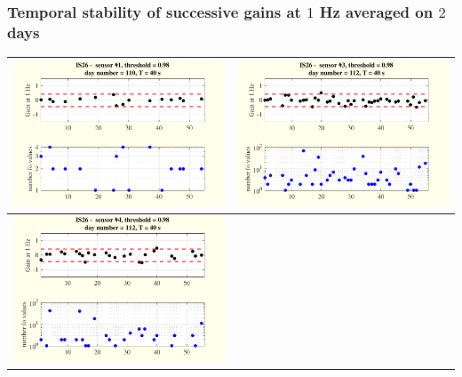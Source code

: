 \documentclass[handout,9pt]{beamer}
\begin{document}
\begin{frame}
\frametitle
{Temporal stability of successive gains at $1$ Hz averaged on $2$ days}
\begin{tabular}{c||c}
\includegraphics[scale=0.3]{evolutionon1atfreq1bis.pdf}
&
\includegraphics[scale=0.3]{evolutionon3atfreq1bis.pdf}
\\
\hline\hline
\includegraphics[scale=0.3]{evolutionon4atfreq1bis.pdf}

\end{tabular}
\end{frame}
\end{document}
